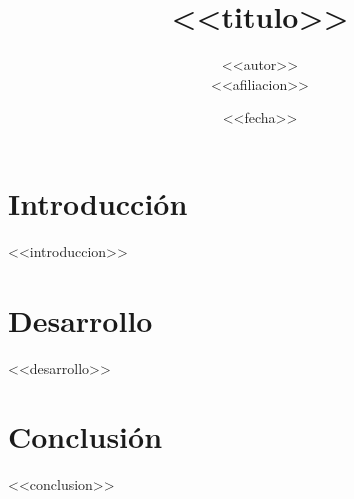 \documentclass[12pt]{article}
\title{\textbf{<<titulo>>}}
\author{<<autor>> \\ <<afiliacion>>}
\date{<<fecha>>}
\begin{document}
\maketitle

\section*{Introducción}
<<introduccion>>

\section*{Desarrollo}
<<desarrollo>>

\section*{Conclusión}
<<conclusion>>

\printbibliography[title={Referencias}]
\end{document}
